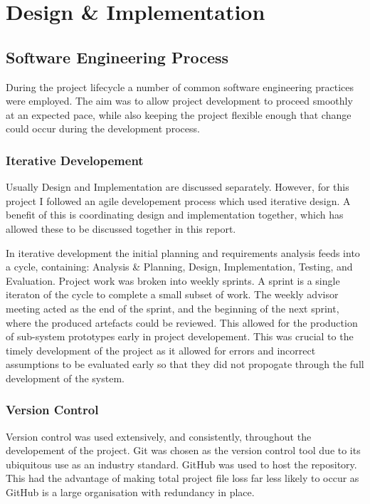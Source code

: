 \documentclass{l4proj}
\begin{document}
\chapter{Design \& Implementation}

\section{Software Engineering Process}

During the project lifecycle a number of common software engineering practices were employed. The aim was to allow project development to proceed smoothly at an expected pace, while also keeping the project flexible enough that change could occur during the development process.

\subsection{Iterative Developement}

Usually Design and Implementation are discussed separately. However, for this project I followed an agile developement process which used iterative design. A benefit of this is coordinating design and implementation together, which has allowed these to be discussed together in this report.

In iterative development the initial planning and requirements analysis feeds into a cycle, containing: Analysis \& Planning, Design, Implementation, Testing, and Evaluation. Project work was broken into weekly sprints. A sprint is a single iteraton of the cycle to complete a small subset of work. The weekly advisor meeting acted as the end of the sprint, and the beginning of the next sprint, where the produced artefacts could be reviewed. This allowed for the production of sub-system prototypes early in project developement. This was crucial to the timely development of the project as it allowed for errors and incorrect assumptions to be evaluated early so that they did not propogate through the full development of the system.

\subsection{Version Control}

Version control was used extensively, and consistently, throughout the developement of the project. Git was chosen as the version control tool due to its ubiquitous use as an industry standard. GitHub was used to host the repository. This had the advantage of making total project file loss far less likely to occur as GitHub is a large organisation with redundancy in place.
\end{document}
